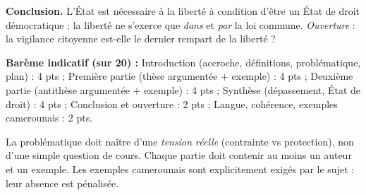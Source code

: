 \documentclass[11pt]{article}
\begin{document}
\begin{corrige}
\textbf{Conclusion.} L'État est nécessaire à la liberté à condition d'être un État de droit démocratique : la liberté ne s'exerce que \emph{dans} et \emph{par} la loi commune. \emph{Ouverture} : la vigilance citoyenne est-elle le dernier rempart de la liberté ?

\textbf{Barème indicatif (sur 20) :} Introduction (accroche, définitions, problématique, plan) : 4 pts ; Première partie (thèse argumentée + exemple) : 4 pts ; Deuxième partie (antithèse argumentée + exemple) : 4 pts ; Synthèse (dépassement, État de droit) : 4 pts ; Conclusion et ouverture : 2 pts ; Langue, cohérence, exemples camerounais : 2 pts.
\end{corrige}

\begin{attention}
La problématique doit naître d'une \emph{tension réelle} (contrainte vs protection), non d'une simple question de cours. Chaque partie doit contenir au moins un auteur et un exemple. Les exemples camerounais sont explicitement exigés par le sujet : leur absence est pénalisée.
\end{attention}
\end{document}
